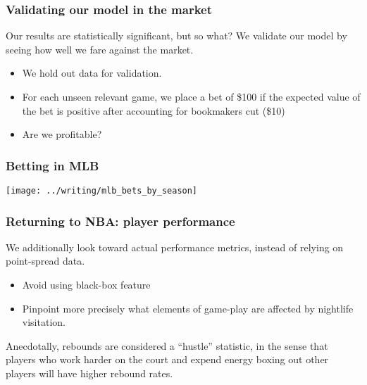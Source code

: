 \documentclass{beamer}
\begin{document}
\begin{frame}   \frametitle{Validating our model in the market}
  Our results are statistically significant, but so what? We validate our model by seeing
  how well we fare against the market.

  \begin{itemize}     \item We hold out data for validation.
    \item For each unseen relevant game, we place a bet of \$100 if the expected value of the bet
      is positive after accounting for bookmakers cut (\$10)
    \item Are we profitable?
  \end{itemize} \end{frame}

\begin{frame}   \frametitle{Betting in MLB}
  \centering
  \texttt{[image: ../writing/mlb\_bets\_by\_season]} \end{frame}

\begin{frame}   \frametitle{Returning to NBA: player performance}
  We additionally look toward actual performance metrics, instead of relying on point-spread data.
  
  \vspace{12pt}
  \begin{itemize}     
    \item Avoid using black-box feature
    \item Pinpoint more precisely what elements of game-play are affected by nightlife visitation.   
\end{itemize}

\vspace{12pt}  Anecdotally, rebounds are considered a ``hustle'' statistic, in the sense that players
  who work harder on the court and expend energy boxing out other players will have higher
  rebound rates. \end{frame}

\end{document}
